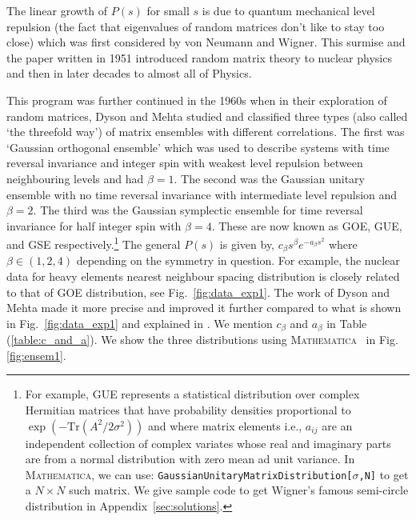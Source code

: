 \documentclass[letter,11pt]{article}
\newcommand{\MA}{\textsc{Mathematica}}
\begin{document}
The linear growth of $P(s)$ for small $s$ is due to quantum mechanical level repulsion (the fact that eigenvalues of random matrices don't like to stay too close)
which was first considered by von Neumann and Wigner. 
This surmise and the paper written in 1951
\cite{Wigner1951OnTS} introduced random matrix theory 
to nuclear physics and then in later decades to almost all of Physics.

This program was further continued in the 1960s when in their exploration of random matrices, Dyson and Mehta studied and classified three types (also called `the threefold way') of matrix ensembles with different correlations. The first was `Gaussian orthogonal ensemble' which was used to describe systems with time reversal invariance and integer spin with weakest level repulsion between neighbouring levels and had $\beta=1$. The second was the Gaussian unitary ensemble with no time reversal invariance with intermediate level repulsion and $\beta=2$. The third was the Gaussian symplectic ensemble for time reversal invariance for half integer spin with $\beta=4$. These are now known as GOE, GUE, and GSE respectively.\footnote{For example, GUE represents a statistical distribution over complex Hermitian matrices 
that have probability densities proportional to $ \exp(-\mbox{Tr}(A^2/2\sigma^2))$ and
where matrix elements i.e., $a_{ij}$ are an independent collection of complex 
variates whose real and imaginary parts are from a normal distribution
with zero mean ad unit variance. In \MA, we can use: 
\texttt{GaussianUnitaryMatrixDistribution[$\sigma$,N]}
to get a $N \times N$ such matrix. We give sample code to get Wigner's famous semi-circle
distribution in Appendix~\ref{sec:solutions}.} 
The general $P(s)$ is given by, $c_{\beta}s^{\beta} e^{-a_{\beta}s^2}$ 
where $\beta \in (1,2,4)$ depending on the symmetry in question. 
For example, the nuclear data for heavy elements nearest neighbour spacing distribution
is closely related to that of GOE distribution, see Fig.~\ref{fig:data_exp1}. 
The work of Dyson and Mehta made it more precise and improved it further 
compared to what is shown in Fig.~\ref{fig:data_exp1} and explained in 
\cite{PhysRevLett.48.1086}. We mention $c_{\beta}$ and  $a_{\beta}$ in Table (\ref{table:c_and_a}). 
We show the three distributions using \MA~ in Fig. \ref{fig:ensem1}.  
\end{document}
